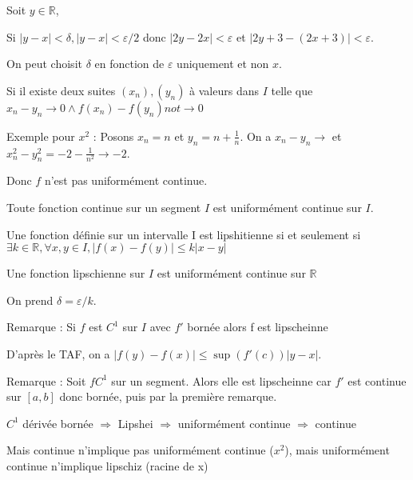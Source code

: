 \documentclass[french]{yLectureNote}
\newcommand{\R}[0]{\mathbb{R}}
\begin{document}
Soit $y\in\R$,

Si $|y-x| <\delta, |y-x| < \varepsilon/2$ donc $|2y-2x| <\varepsilon$ et $|2y+3-(2x+3)| <\varepsilon$.

On peut choisit $\delta$ en fonction de $\varepsilon$ uniquement et non $x$.

\begin{lemma}
Si il existe deux suites  $(x_n), (y_n)$ à valeurs dans $I$ telle que $x_n-y_n \to 0 \wedge f(x_n)-f(y_n) not \to 0$
\end{lemma}

Exemple pour $x^2$ : Posons $x_n = n$ et $y_n = n+\frac{1}{n}$. On a $x_n-y_n \to$ et $x_n^2-y_n^2 = -2-\frac{1}{n^2} \to -2$.

Donc $f$ n'est pas uniformément continue.
\begin{theorem}
 Toute fonction continue sur un segment $I$ est uniformément continue sur $I$.
\end{theorem}
\begin{definition}
Une fonction définie sur un intervalle I est lipshitienne si et seulement si \(\exists k\in\R,\forall x,y\in I, |f(x)-f(y)|\leq k|x-y|\)
\end{definition}
\begin{theorem}[]
 Une fonction lipschienne sur $I$ est uniformément continue sur $\R$
\end{theorem}
\begin{myproof}
On prend $\delta = \varepsilon/k$.
\end{myproof}
Remarque : Si $f$ est $C^1$ sur $I$ avec $f'$ bornée alors f est lipscheinne
\begin{myproof}
D'après le TAF, on a $|f(y)-f(x)| \leq \sup(f'(c)) |y-x|$.
\end{myproof}
Remarque : Soit $f C^1$ sur un segment. Alors elle est lipscheinne car $f'$ est continue sur $[a,b]$ donc bornée, puis par la première remarque.

$C^1$ dérivée bornée $\Rightarrow$ Lipshei $\Rightarrow$ uniformément continue $\Rightarrow$ continue

Mais continue n'implique pas uniformément continue ($x^2$), mais uniformément continue n'implique lipschiz (racine de x)
\end{document}
